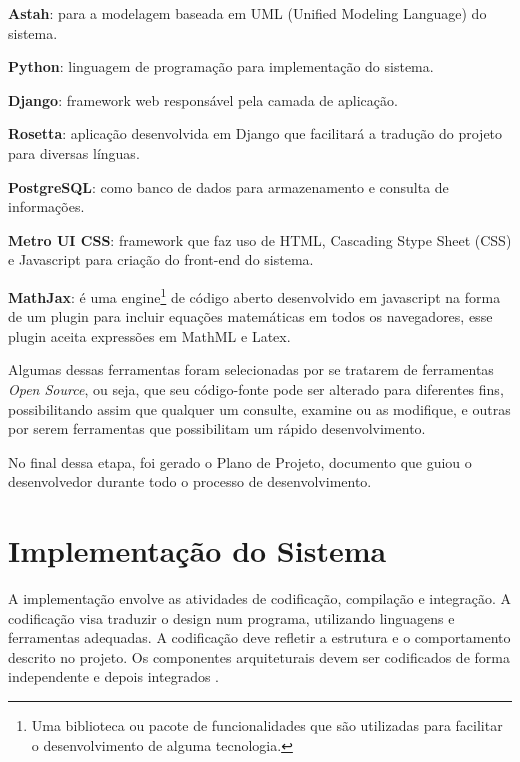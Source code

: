 \begin{alineas}
	\item \textbf{Astah}: para a modelagem baseada em UML (Unified Modeling Language) do sistema.
	\item \textbf{Python}: linguagem de programação para implementação do sistema.
    \item \textbf{Django}: framework web responsável pela camada de aplicação.
    \item \textbf{Rosetta}: aplicação desenvolvida em Django que facilitará a tradução do projeto para diversas línguas.  
    \item \textbf{PostgreSQL}: como banco de dados para armazenamento e consulta de informações.
    \item \textbf{Metro UI CSS}: framework que faz uso de HTML, Cascading Stype Sheet (CSS) e Javascript para criação do front-end do sistema.
    \item \textbf{MathJax}: \'e uma engine\footnote{Uma biblioteca ou pacote de funcionalidades que são utilizadas para facilitar o desenvolvimento de alguma tecnologia.} de código aberto 
desenvolvido em 
javascript na forma de um plugin para incluir equações matemáticas em todos os navegadores, esse plugin aceita expressões em  MathML e Latex.

\end{alineas}

Algumas dessas ferramentas foram selecionadas por se tratarem de ferramentas \textit{Open Source}, ou seja, que seu código-fonte pode ser 
alterado para diferentes fins, possibilitando assim que qualquer um consulte, examine ou as modifique, e outras por serem ferramentas que 
possibilitam um rápido desenvolvimento.

No final dessa etapa, foi gerado o Plano de Projeto, documento que guiou o desenvolvedor durante todo o processo de desenvolvimento.

\section{Implementação do Sistema}

A implementação envolve as atividades de codificação, compilação e integração. A codificação visa traduzir o design num programa, utilizando linguagens e  ferramentas adequadas. A codificação 
deve refletir a estrutura e o comportamento descrito no projeto. Os componentes arquiteturais devem ser codificados de forma independente e depois integrados \cite{aguiar2012requisitos}.

